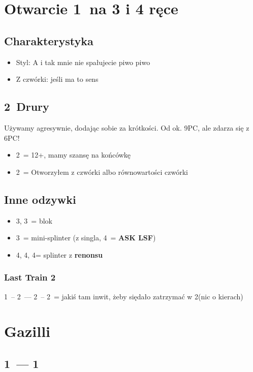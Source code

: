 \documentclass[12pt, a4paper]{article}
\newcommand{\lsf}{\color{WildStrawberry}\textbf{ASK LSF}\color{black}}
\begin{document}
\pagebreak
\section{Otwarcie 1\major\ na 3 i 4 ręce}
\subsection*{Charakterystyka}
\begin{itemize}
    \item Styl: A i tak mnie nie spałujecie piwo piwo
    \item Z czwórki: jeśli ma to sens
\end{itemize}

\subsection*{2\clubs\ Drury}
Używamy agresywnie, dodając sobie za krótkości. Od ok. 9PC, ale zdarza się z 6PC!
\begin{itemize}
    \item 2\diams\ = 12+, mamy szansę na końcówkę
    \item 2\major\ = Otworzyłem z czwórki albo równowartości czwórki
\end{itemize}

\subsection*{Inne odzywki} 
\begin{itemize}
    \item 3\hearts, 3\spades\ = blok
    \item 3\nt\ = mini-splinter (z singla, 4\clubs\ = \lsf)
    \item 4\clubs, 4\diams, 4\hearts = splinter z \textbf{renonsu}
\end{itemize}

\subsubsection*{Last Train 2\hearts}
1\spades\ -- 2\clubs\ --- 2\diams\ -- 2\hearts\ = jakiś tam inwit, żeby siędało zatrzymać w 2\spades (nic o kierach)


\pagebreak
\section{Gazilli}
\subsection*{1\hearts\ --- 1\spades}
\end{document}
